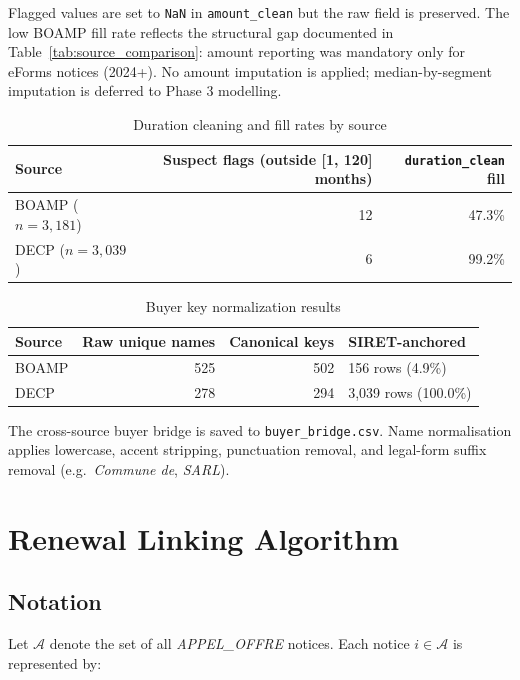 \documentclass[12pt, a4paper]{article}
\begin{document}
\noindent Flagged values are set to \texttt{NaN} in \texttt{amount\_clean} but the raw field
is preserved. The low BOAMP fill rate reflects the structural gap documented in
Table~\ref{tab:source_comparison}: amount reporting was mandatory only for eForms
notices (2024+). No amount imputation is applied; median-by-segment imputation is deferred
to Phase 3 modelling.

\begin{table}[H]
\centering
\caption{Duration cleaning and fill rates by source}
\label{tab:duration_cleaning}
\small
\begin{tabular}{@{}l rr@{}}
\toprule
Source & Suspect flags (outside [1, 120] months) & \texttt{duration\_clean} fill \\
\midrule
BOAMP ($n=3{,}181$) & 12 & 47.3\% \\
DECP  ($n=3{,}039$) &  6 & 99.2\% \\
\bottomrule
\end{tabular}
\normalsize
\end{table}

\begin{table}[H]
\centering
\caption{Buyer key normalization results}
\label{tab:buyer_norm}
\small
\begin{tabular}{@{}l rrl@{}}
\toprule
Source & Raw unique names & Canonical keys & SIRET-anchored \\
\midrule
BOAMP & 525 & 502 & 156 rows (4.9\%) \\
DECP  & 278 & 294 & 3,039 rows (100.0\%) \\
\bottomrule
\end{tabular}
\normalsize
\end{table}

\noindent The cross-source buyer bridge is saved to \texttt{buyer\_bridge.csv}. Name
normalisation applies lowercase, accent stripping, punctuation removal, and legal-form
suffix removal (e.g.\ \textit{Commune de}, \textit{SARL}).

\section{Renewal Linking Algorithm}

\subsection{Notation}

Let $\mathcal{A}$ denote the set of all \textit{APPEL\_OFFRE} notices. Each
notice $i \in \mathcal{A}$ is represented by:
\end{document}

